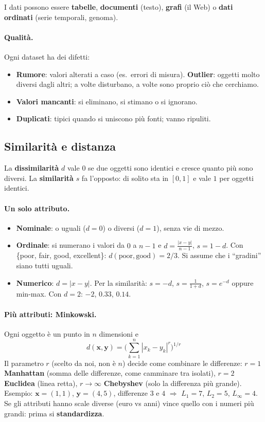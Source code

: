 \noindent I dati possono essere \textbf{tabelle}, \textbf{documenti} (testo), \textbf{grafi} (il Web) o \textbf{dati ordinati} (serie temporali, genoma).

\paragraph*{Qualità.} Ogni dataset ha dei difetti:
\begin{itemize}
    \item \textbf{Rumore}: valori alterati a caso (es.\ errori di misura). \textbf{Outlier}: oggetti molto diversi dagli altri; a volte disturbano, a volte sono proprio ciò che cerchiamo.
    \item \textbf{Valori mancanti}: si eliminano, si stimano o si ignorano.
    \item \textbf{Duplicati}: tipici quando si uniscono più fonti; vanno ripuliti.
\end{itemize}

\subsection*{Similarità e distanza}
La \textbf{dissimilarità} $d$ vale $0$ se due oggetti sono identici e cresce quanto più sono diversi. La \textbf{similarità} $s$ fa l'opposto: di solito sta in $[0,1]$ e vale $1$ per oggetti identici.

\paragraph*{Un solo attributo.}
\begin{itemize}
    \item \textbf{Nominale}: o uguali ($d=0$) o diversi ($d=1$), senza vie di mezzo.
    \item \textbf{Ordinale}: si numerano i valori da $0$ a $n-1$ e $d=\frac{|x-y|}{n-1}$, $s=1-d$. Con \{poor, fair, good, excellent\}: $d(\text{poor},\text{good})=2/3$. Si assume che i ``gradini'' siano tutti uguali.
    \item \textbf{Numerico}: $d=|x-y|$. Per la similarità: $s=-d$, $s=\frac{1}{1+d}$, $s=e^{-d}$ oppure min-max. Con $d=2$: $-2$, $0.33$, $0.14$.
\end{itemize}

\paragraph*{Più attributi: Minkowski.} Ogni oggetto è un punto in $n$ dimensioni e
\[
d(\mathbf{x},\mathbf{y})=\Big(\sum_{k=1}^{n}|x_k-y_k|^r\Big)^{1/r}
\]
Il parametro $r$ (scelto da noi, non è $n$) decide come combinare le differenze:
$r=1$ \textbf{Manhattan} (somma delle differenze, come camminare tra isolati),
$r=2$ \textbf{Euclidea} (linea retta),
$r\to\infty$ \textbf{Chebyshev} (solo la differenza più grande).
Esempio: $\mathbf{x}=(1,1)$, $\mathbf{y}=(4,5)$, differenze $3$ e $4$ $\Rightarrow$ $L_1=7$, $L_2=5$, $L_\infty=4$.
Se gli attributi hanno scale diverse (euro vs anni) vince quello con i numeri più grandi: prima si \textbf{standardizza}.

